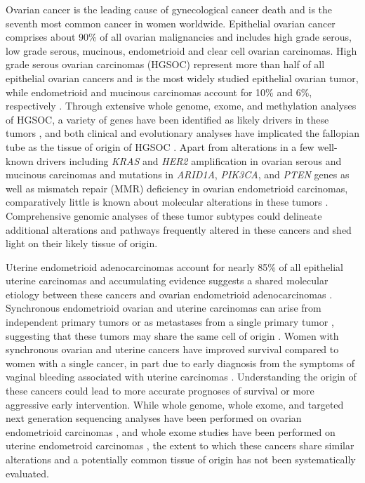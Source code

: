 
Ovarian cancer is the leading cause of gynecological cancer death and is the seventh most common cancer in women worldwide.
Epithelial ovarian cancer comprises about 90\% of all ovarian malignancies and includes high grade serous, low grade serous, mucinous, endometrioid and clear cell ovarian carcinomas.
High grade serous ovarian carcinomas (HGSOC) represent more than half of all epithelial ovarian cancers and is the most widely studied epithelial ovarian tumor, while endometrioid and mucinous carcinomas account for 10\% and 6\%, respectively \cite{torre2018}.
Through extensive whole genome, exome, and methylation analyses of HGSOC, a variety of genes have been identified as likely drivers in these tumors \cite{cancergenomeatlasresearchnetwork2011}, and both clinical and evolutionary analyses have implicated the fallopian tube as the tissue of origin of HGSOC \cite{labidi-galy2017, eckert2016, ducie2017, piek2001, finch2006, medeiros2006, kuhn2012, perets2013, rabban2014}.
Apart from alterations in a few well-known drivers including \textit{KRAS} and \textit{HER2} amplification in ovarian serous and mucinous carcinomas and mutations in \textit{ARID1A}, \textit{PIK3CA}, and \textit{PTEN} genes as well as mismatch repair (MMR) deficiency in ovarian endometrioid carcinomas, comparatively little is known about molecular alterations in these tumors \cite{slamon1989}.
Comprehensive genomic analyses of these tumor subtypes could delineate additional alterations and pathways frequently altered in these cancers and shed light on their likely tissue of origin.

Uterine endometrioid adenocarcinomas account for nearly 85\% of all epithelial uterine carcinomas and accumulating evidence suggests a shared molecular etiology between these cancers and ovarian endometrioid adenocarcinomas \cite{buhtoiarova2016}.
Synchronous endometrioid ovarian and uterine carcinomas can arise from independent primary tumors or as metastases from a single primary tumor \cite{makris2017, hajkova2019}, suggesting that these tumors may share the same cell of origin \cite{wu2001, wu2017}.
Women with synchronous ovarian and uterine cancers have improved survival compared to women with a single cancer, in part due to early diagnosis from the symptoms of vaginal bleeding associated with uterine carcinomas \cite{matsuo2018}. %
Understanding the origin of these cancers could lead to more accurate prognoses of survival or more aggressive early intervention.
While whole genome, whole exome, and targeted next generation sequencing analyses have been performed on ovarian endometrioid carcinomas \cite{wang2017, hoang2015, hollis2020},  and whole exome studies have been performed on uterine endometroid carcinomas \cite{cancergenomeatlasresearchnetwork2013}, the extent to which these cancers share similar alterations and a potentially common tissue of origin has not been systematically evaluated.

